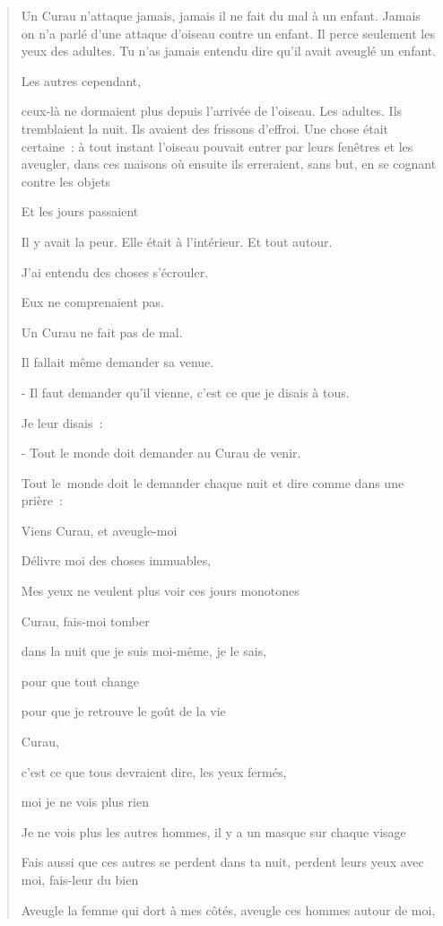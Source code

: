 \begin{quote}
Un Curau n'attaque jamais, jamais il ne fait du mal à un enfant. Jamais
on n'a parlé d'une attaque d'oiseau contre un enfant. Il perce seulement
les yeux des adultes. Tu n'as jamais entendu dire qu'il avait aveuglé un
enfant.

Les autres cependant,

ceux-là ne dormaient plus depuis l'arrivée de l'oiseau. Les adultes. Ils
tremblaient la nuit. Ils avaient des frissons d'effroi. Une chose était
certaine~: à tout instant l'oiseau pouvait entrer par leurs fenêtres et
les aveugler, dans ces maisons où ensuite ils erreraient, sans but, en
se cognant contre les objets

Et les jours passaient

Il y avait la peur. Elle était à l'intérieur. Et tout autour.

J'ai entendu des choses s'écrouler.

Eux ne comprenaient pas.

Un Curau ne fait pas de mal.

Il fallait même demander sa venue.

- Il faut demander qu'il vienne, c'est ce que je disais à tous.

Je leur disais~:

- Tout le monde doit demander au Curau de venir.

Tout le~monde doit le demander chaque nuit et dire comme dans une
prière~:

Viens Curau, et aveugle-moi

Délivre moi des choses immuables,

Mes yeux ne veulent plus voir ces jours monotones

Curau, fais-moi tomber

dans la nuit que je suis moi-même, je le sais,

pour que tout change

pour que je retrouve le goût de la vie

Curau,

c'est ce que tous devraient dire, les yeux fermés,

moi je ne vois plus rien

Je ne vois plus les autres hommes, il y a un masque sur chaque visage

Fais aussi que ces autres se perdent dans ta nuit, perdent leurs yeux
avec moi, fais-leur du bien

Aveugle la femme qui dort à mes côtés, aveugle ces hommes autour de moi,


\end{quote}
